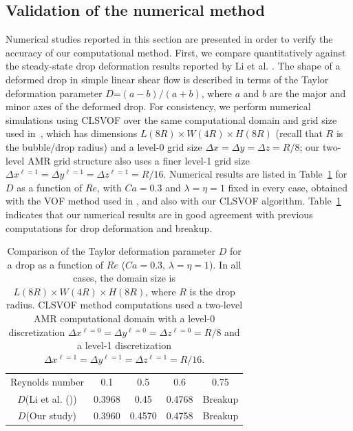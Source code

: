 \documentclass[review]{elsarticle}
\newcommand{\lwh}[3]{L(#1R)\times W(#2R) \times H(#3R)}
\begin{document}
\subsection{Validation of the numerical method}
Numerical studies reported in this section
are presented in order to verify the accuracy of our computational
method.  First, we compare quantitatively against the steady-state drop
deformation results reported by Li et al. \cite{LiRenRen00}.  The shape of a
deformed drop in simple linear shear flow is described in terms of the Taylor
deformation parameter $D$=$(a-b)/(a+b)$, 
where $a$ and $b$ are the major and minor axes of the deformed drop.  
For consistency, we perform numerical simulations using CLSVOF over the same
computational domain and grid size used in~\cite{LiRenRen00}, which has dimensions 
$\lwh{8}{4}{8}$ (recall that $R$ is
the bubble/drop radius) and a level-0 grid size $\Delta x=\Delta y=\Delta
z=R/8$; our two-level AMR grid structure also uses a finer level-1 grid size
$\Delta x^{\ell=1} = \Delta y^{\ell=1} = \Delta z^{\ell=1} = R/16$.  Numerical
results are listed in Table~\ref{tab:DeComparison} for $D$ 
as a function of $Re$, with $Ca=0.3$ and $\lambda = \eta = 1$ fixed in every case, obtained with
the VOF method used in \cite{LiRenRen00}, and also with our CLSVOF algorithm.
Table~\ref{tab:DeComparison} indicates that our numerical results are in good
agreement with previous computations for drop deformation and breakup.
%
\begin{table}[tbh]
\caption{Comparison of the Taylor deformation parameter $D$ for a drop as a function 
         of $Re$ ($Ca=0.3$, $\lambda = \eta = 1$). In all cases, the domain 
         size is $\lwh{8}{4}{8}$, where $R$ is the drop radius.
         CLSVOF method computations used a two-level AMR computational domain 
         with a level-0 discretization $\Delta x^{\ell=0} = \Delta y^{\ell=0} 
         = \Delta z^{\ell=0} = R/8$ and a level-1 discretization
         $\Delta x^{\ell=1} = \Delta y^{\ell=1} = \Delta z^{\ell=1} = R/16$.}
\label{tab:DeComparison}
\center
\begin{tabular}{ c  c  c  c  c }
\hline
\hline
Reynolds number                      & 0.1     & 0.5     & 0.6     & 0.75      \\
$D$(Li et al. (\cite{LiRenRen00}))  & 0.3968  & 0.45    & 0.4768  & Breakup   \\
$D$(Our study) & 0.3960  & 0.4570  & 0.4758  & Breakup   \\
\hline
\hline
\end{tabular}
\end{table}
\end{document}
